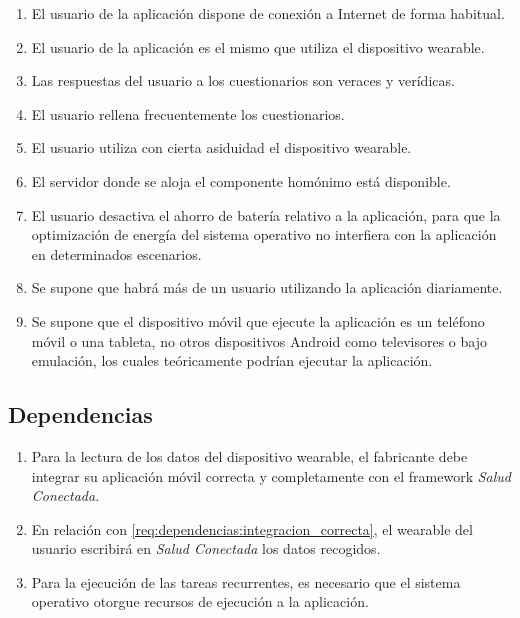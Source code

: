         \label{req:descripcion:suposiciones}

        \begin{enumerate}[label=\textbf{SUP-\arabic*}]
            \item El usuario de la aplicación dispone de conexión a Internet de forma habitual.
            \item El usuario de la aplicación es el mismo que utiliza el dispositivo \gls{wearable}.
            \item Las respuestas del usuario a los cuestionarios son veraces y verídicas.
            \item El usuario rellena frecuentemente los cuestionarios.
            \item El usuario utiliza con cierta asiduidad el dispositivo \gls{wearable}.
            \item El servidor donde se aloja el componente homónimo está disponible.
            \item El usuario desactiva el ahorro de batería relativo a la aplicación, para que la optimización de energía del sistema operativo no interfiera con la aplicación en determinados escenarios.
            \item Se supone que habrá más de un usuario utilizando la aplicación diariamente.
            \item Se supone que el dispositivo móvil que ejecute la aplicación es un teléfono móvil o una tableta, no otros dispositivos Android como televisores o bajo emulación, los cuales teóricamente podrían ejecutar la aplicación.
        \end{enumerate}
        
    \subsection{Dependencias}
        \label{req:descripcion:dependencias}
        
        \begin{enumerate}[label=\textbf{DEP-\arabic*}]
            \item \label{req:dependencias:integracion_correcta} Para la lectura de los datos del dispositivo \gls{wearable}, el fabricante debe integrar su aplicación móvil correcta y completamente con el \gls{framework} \textit{Salud Conectada}.
            \item En relación con \ref{req:dependencias:integracion_correcta}, el \gls{wearable} del usuario escribirá en \textit{Salud Conectada} los datos recogidos.
            \item \label{req:dependencias:planificacion} Para la ejecución de las tareas recurrentes, es necesario que el sistema operativo otorgue recursos de ejecución a la aplicación.
        \end{enumerate}

